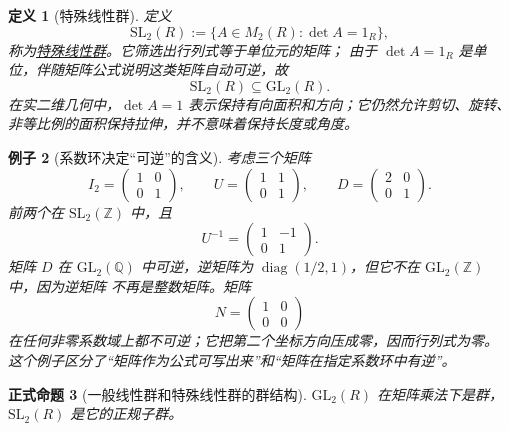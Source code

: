\documentclass[UTF8,fontset=none,a4paper,11pt]{ctexart}
\theoremstyle{foundation-definition}
\newtheorem{definition}{定义}[section]
\theoremstyle{foundation-theorem}
\theoremstyle{foundation-proposition}
\newtheorem{proposition}[definition]{正式命题}
\theoremstyle{foundation-example}
\newtheorem{example}[definition]{例子}
\theoremstyle{foundation-remark}
\theoremstyle{foundation-theorem}
\newcommand{\term}[2]{\hyperref[#1]{#2}}
\begin{document}
\begin{definition}[特殊线性群]\label{def:special-linear-group}
定义
\[
\mathrm{SL}_2(R):=\{A\in M_2(R):\det A=1_R\},
\]
称为\term{def:special-linear-group}{特殊线性群}。它筛选出行列式等于单位元的矩阵；
由于 \(\det A=1_R\) 是单位，伴随矩阵公式说明这类矩阵自动可逆，故
\[
\mathrm{SL}_2(R)\subseteq\mathrm{GL}_2(R).
\]
在实二维几何中，\(\det A=1\) 表示保持有向面积和方向；它仍然允许剪切、旋转、
非等比例的面积保持拉伸，并不意味着保持长度或角度。
\end{definition}

\begin{example}[系数环决定“可逆”的含义]
考虑三个矩阵
\[
I_2=\begin{pmatrix}1&0\\0&1\end{pmatrix},\qquad
U=\begin{pmatrix}1&1\\0&1\end{pmatrix},\qquad
D=\begin{pmatrix}2&0\\0&1\end{pmatrix}.
\]
前两个在 \(\mathrm{SL}_2(\mathbb Z)\) 中，且
\[
U^{-1}=\begin{pmatrix}1&-1\\0&1\end{pmatrix}.
\]
矩阵 \(D\) 在 \(\mathrm{GL}_2(\mathbb Q)\) 中可逆，逆矩阵为
\(\operatorname{diag}(1/2,1)\)，但它不在 \(\mathrm{GL}_2(\mathbb Z)\) 中，因为逆矩阵
不再是整数矩阵。矩阵
\[
N=\begin{pmatrix}1&0\\0&0\end{pmatrix}
\]
在任何非零系数域上都不可逆；它把第二个坐标方向压成零，因而行列式为零。
这个例子区分了“矩阵作为公式可写出来”和“矩阵在指定系数环中有逆”。
\end{example}

\begin{proposition}[一般线性群和特殊线性群的群结构]
\(\mathrm{GL}_2(R)\) 在矩阵乘法下是群，\(\mathrm{SL}_2(R)\) 是它的正规子群。
\end{proposition}
\end{document}
